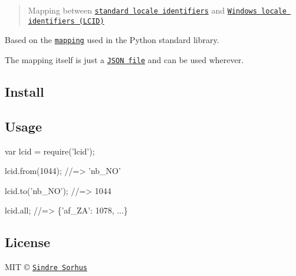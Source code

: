 \begin{quote}
Mapping between \href{http://en.wikipedia.org/wiki/Locale}{\tt standard locale identifiers} and \href{http://en.wikipedia.org/wiki/Locale#Specifics_for_Microsoft_platforms}{\tt Windows locale identifiers (L\+C\+ID)} \end{quote}


Based on the \href{https://github.com/python/cpython/blob/be2a1a76fa43bb1ea1b3577bb5bdd506a2e90e37/Lib/locale.py#L1395-L1604}{\tt mapping} used in the Python standard library.

The mapping itself is just a \href{lcid.json}{\tt J\+S\+ON file} and can be used wherever.

\subsection*{Install}




\subsection*{Usage}


\begin{DoxyCode}
var lcid = require('lcid');

lcid.from(1044);
//=> 'nb\_NO'

lcid.to('nb\_NO');
//=> 1044

lcid.all;
//=> \{'af\_ZA': 1078, ...\}
\end{DoxyCode}


\subsection*{License}

M\+IT © \href{http://sindresorhus.com}{\tt Sindre Sorhus} 